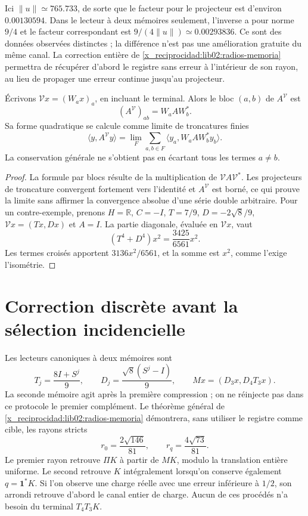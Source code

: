 Ici \(\|u\|\simeq765.733\), de sorte que le facteur pour le projecteur
est d’environ \(0.00130594\). Dans le lecteur à deux mémoires seulement,
l’inverse a pour norme \(9/4\) et le facteur correspondant est
\(9/(4\|u\|)\simeq0.00293836\). Ce sont des données observées distinctes ;
la différence n’est pas une amélioration gratuite du même canal. La correction
entière de \cref{x_reciprocidad:lib02:radios-memoria} permettra de récupérer d’abord le
registre sans erreur à l’intérieur de son rayon, au lieu de propager une erreur
continue jusqu’au projecteur.

\begin{proposition}
\label{x_reciprocidad:lib01:correlaciones}
Écrivons \(\mathcal Vx=(W_ax)_a\), en incluant le terminal. Alors
le bloc \((a,b)\) de \(A^{\mathcal V}\) est
\[
 (A^{\mathcal V})_{ab}=W_aAW_b^*.
\]
Sa forme quadratique se calcule comme limite de troncatures finies
\[
 \langle y,A^{\mathcal V}y\rangle
 =\lim_F\sum_{a,b\in F}\langle y_a,W_aAW_b^*y_b\rangle.
\]
La conservation générale ne s’obtient pas en écartant tous les termes
\(a\ne b\).
\end{proposition}
\begin{proof}
La formule par blocs résulte de la multiplication de \(\mathcal VA\mathcal V^*\). Les projecteurs de troncature convergent fortement vers l'identité et \(A^{\mathcal V}\) est borné, ce qui prouve la limite sans affirmer la convergence absolue d'une série double arbitraire. Pour un contre-exemple, prenons \(H=\mathbb R\), \(C=-I\), \(T=7/9\), \(D=-2\sqrt8/9\), \(\mathcal Vx=(Tx,Dx)\) et \(A=I\). La partie diagonale, évaluée en \(\mathcal Vx\), vaut
\[
 (T^4+D^4)x^2=\frac{3425}{6561}x^2.
\]
Les termes croisés apportent \(3136x^2/6561\), et la somme est
\(x^2\), comme l’exige l’isométrie.
\end{proof}

\section{Correction discrète avant la sélection incidencielle}
\label{x_reciprocidad:lib01:correccion-incidencia}

Les lecteurs canoniques à deux mémoires sont
\[
 T_j=\frac{8I+S^j}{9},\qquad
 D_j=\frac{\sqrt8(S^j-I)}9,\qquad
 Mx=(D_3x,D_4T_3x).
\]
La seconde mémoire agit après la première compression ; on ne réinjecte pas
dans ce protocole le premier complément. Le théorème général de
\cref{x_reciprocidad:lib02:radios-memoria} démontrera, sans utiliser le registre comme
cible, les rayons stricts
\[
 r_0=\frac{2\sqrt{146}}{81},\qquad
 r_q=\frac{4\sqrt{73}}{81}.
\]
Le premier rayon retrouve \(\Pi K\) à partir de \(MK\), modulo la
translation entière uniforme. Le second retrouve \(K\) intégralement lorsqu’on
conserve également \(q=\mathbf1^*K\). Si l’on observe une charge réelle
avec une erreur inférieure à \(1/2\), son arrondi retrouve d’abord le canal entier
de charge. Aucun de ces procédés n’a besoin du terminal
\(T_4T_3K\).

